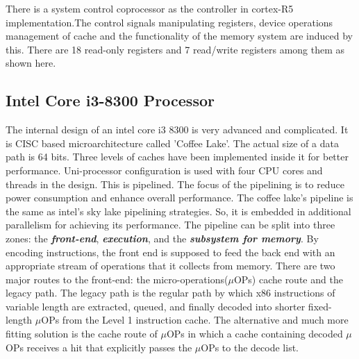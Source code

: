 \documentclass[a4paper,11pt]{article}
\begin{document}
There is a system control coprocessor as the controller in cortex-R5 implementation.The control signals manipulating registers, device operations management of cache and the functionality of the memory system are induced by this. There are 18 read-only registers and 7 read/write registers among them as shown here.


\subsection{Intel Core i3-8300 Processor}
The internal design of an intel core i3 8300 is very advanced and complicated. It is CISC based microarchitecture called 'Coffee Lake'.  The actual size of a data path is 64 bits. Three levels of caches have been implemented inside it for better performance. Uni-processor configuration is used with four CPU cores and threads in the design. This is pipelined. The focus of the pipelining is to reduce power consumption and enhance overall performance. The coffee lake's pipeline is the same as intel's sky lake pipelining strategies. So, it is embedded in additional parallelism for achieving its performance. The pipeline can be split into three zones: the \textbf{\textit{front-end}}, \textit{\textbf{execution}}, and the \textbf{\textit{subsystem for memory}}. By encoding instructions, the front end is supposed to feed the back end with an appropriate stream of operations that it collects from memory. There are two major routes to the front-end: the micro-operations($\mu$OPs) cache route and the legacy path. The legacy path is the regular path by which x86 instructions of variable length are extracted, queued, and finally decoded into shorter fixed-length $\mu$OPs from the Level 1 instruction cache. The alternative and much more fitting solution is the cache route of $\mu$OPs in which a cache containing decoded $\mu$OPs receives a hit that explicitly passes the $\mu$OPs to the decode list.\\
\end{document}
